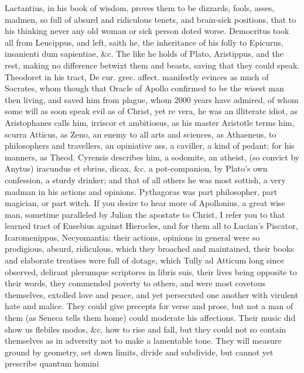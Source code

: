 {Lactantius, in his book of wisdom, proves them to be dizzards,
fools, asses, madmen, so full of absurd and ridiculous tenets, and
brain-sick positions, that to his thinking never any old woman or sick
person doted worse. Democritus took all from Leucippus, and left,
saith he, the inheritance of his folly to Epicurus, insanienti dum
sapientiae, \&c. The like he holds of Plato, Aristippus, and the rest,
making no difference betwixt them and beasts, saving that they
could speak. Theodoret in his tract, De cur. grec. affect.
manifestly evinces as much of Socrates, whom though that Oracle of
Apollo confirmed to be the wisest man then living, and saved him from
plague, whom 2000 years have admired, of whom some will as soon speak
evil as of Christ, yet re vera, he was an illiterate idiot, as
Aristophanes calls him, irriscor et ambitiosus, as his master
Aristotle terms him, scurra Atticus, as Zeno, an enemy to all arts
and sciences, as Athaeneus, to philosophers and travellers, an
opiniative ass, a caviller, a kind of pedant; for his manners, as
Theod. Cyrensis describes him, a  sodomite, an atheist, (so
convict by Anytus) iracundus et ebrius, dicax, \&c. a pot-companion, by
Plato's own confession, a sturdy drinker; and that of all others
he was most sottish, a very madman in his actions and opinions.
Pythagoras was part philosopher, part magician, or part witch. If you
desire to hear more of Apollonius, a great wise man, sometime
paralleled by Julian the apostate to Christ, I refer you to that
learned tract of Eusebius against Hierocles, and for them all to
Lucian's Piscator, Icaromenippus, Necyomantia: their actions, opinions
in general were so prodigious, absurd, ridiculous, which they broached
and maintained, their books and elaborate treatises were full of
dotage, which Tully ad Atticum long since observed, delirant plerumque
scriptores in libris suis, their lives being opposite to their words,
they commended poverty to others, and were most covetous themselves,
extolled love and peace, and yet persecuted one another with virulent
hate and malice. They could give precepts for verse and prose, but not
a man of them (as Seneca tells them home) could moderate his
affections. Their music did show us flebiles modos, \&c. how to rise and
fall, but they could not so contain themselves as in adversity not to
make a lamentable tone. They will measure ground by geometry, set down
limits, divide and subdivide, but cannot yet prescribe quantum homini
}
